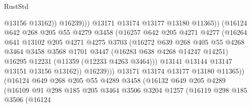 \begin{lexlean}{RustStd}
\begin{coremodule}
{{{{{{{{{{{{{{{{{{{                                      @13156
                                      @13162))
                                  @16239)))
                            @13171
                            @13174
                            @13177
                            @13180
                            @11365))
                        (@16124
                          @642
                          @268
                          @205
                          @55
                          @4279
                          @3458
                          (@16257
                            @642
                            @205
                            @4271
                            @4277
                            (@16264
                              @641
                              @13102
                              @205
                              @4271
                              @4275
                              @3703
                              (@16272
                                @639
                                @268
                                @405
                                @55
                                @4268
                                @3464
                                @3458
                                @3568
                                @1701
                                @3447
                                (@16283 @638 @4268 @14247 @14251)
                                @16295
                                @12231
                                (@11359 (@12233 @4263 @3464)))
                              @13141
                              @13144
                              @13147
                              @13151
                              @13156
                              @13162))
                          @16239)))
                    @13171
                    @13174
                    @13177
                    @13180
                    @11365))
                (@16124
                  @649
                  @268
                  @205
                  @55
                  @4289
                  @3458
                  (@16132
                    @649
                    @205
                    @4289
                    (@16109
                      @91
                      @298
                      @185
                      @205
                      @3464
                      @3506
                      @3204
                      @1257
                      (@16119
                        @298
                        @185
                        @3506
                        (@16124
}}}}}}}}}}}}}}}}}}}
\end{coremodule}
\end{lexlean}
